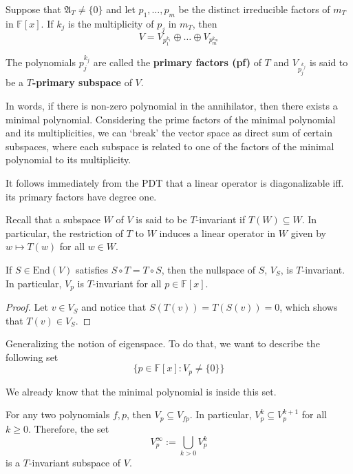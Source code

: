 \begin{theorem}\label{thm:pdt}
	Suppose that $\mathfrak{A}_T \neq \{ 0 \}$ and let $p_1, \ldots, p_m$ be the distinct irreducible factors of $m_T$ in $\mathbb{F}[x]$. If $k_j$ is the multiplicity of $p_j$ in $m_T$, then
	\[
		V = V_{p_1^{k_1}} \oplus \ldots \oplus V_{p_m^{k_m}}
	\]
	
	The polynomials $p_j^{k_j}$ are called the \textbf{primary factors (pf)} of $T$ and $V_{p_j^{k_j}}$ is said to be a \textbf{$T$-primary subspace} of $V$.
\end{theorem}

In words, if there is non-zero polynomial in the annihilator, then there exists a minimal polynomial. Considering the prime factors of the minimal polynomial and its multiplicities, we can `break' the vector space as direct sum of certain subspaces, where each subspace is related to one of the factors of the minimal polynomial to its multiplicity.

It follows immediately from the PDT that a linear operator is diagonalizable iff. its primary factors have degree one.

Recall that a subspace $W$ of $V$ is said to be $T$-invariant if $T(W) \subseteq W$. In particular, the restriction of $T$ to $W$ induces a linear operator in $W$ given by $w \mapsto T(w)$ for all $w \in W$.

\begin{lemma}
	If $S \in \text{End}(V)$ satisfies $S \circ T = T \circ S$, then the nullspace of $S$, $V_S$, is $T$-invariant. In particular, $V_p$ is $T$-invariant for all $p \in \mathbb{F}[x]$.
\end{lemma}

\begin{proof}
	Let $v \in V_S$ and notice that $S(T(v)) = T(S(v)) = 0$, which shows that $T(v) \in V_S$.
\end{proof}

Generalizing the notion of eigenspace. To do that, we want to describe the following set
\begin{equation}\label{eq:set-goal-describe}
	\{ p \in \mathbb{F}[x] : V_p \neq \{ 0 \} \}
\end{equation}

We already know that the minimal polynomial is inside this set.

For any two polynomials $f, p$, then $V_p \subseteq V_{fp}$. In particular, $V_p^k \subseteq V_p^{k+1}$ for all $k \geq 0$. Therefore, the set
\[
	V_p^\infty := \bigcup_{k > 0} V_p^k
\]
is a $T$-invariant subspace of $V$.

